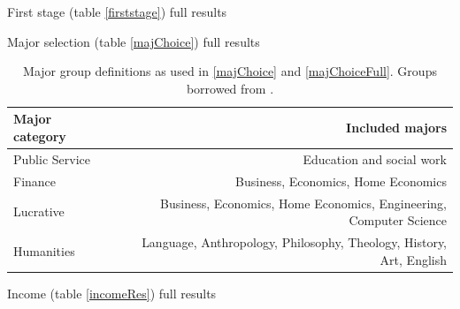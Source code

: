 \documentclass[12pt]{article}
\newcommand{\regs}{../Analysis/Regressions/Output/}
\begin{document}
	\begin{table}
		\centering
		\scriptsize
		\caption{First stage (table \ref{firststage}) full results}
		
		\label{firststagefull}
	\end{table}

	\begin{table}
		\centering
		\scriptsize
		\caption{Major selection (table \ref{majChoice}) full results}
		
		\label{majChoiceFull}
	\end{table}

	\begin{table}
		\centering
		\caption{Major group definitions as used in \ref{majChoice} and \ref{majChoiceFull}. Groups borrowed from \textcite{rothstein2011}.}
		\begin{tabular}{lr}
			\toprule
			Major category & Included majors \\
			\midrule 
			Public Service & Education and social work \\
			Finance & Business, Economics, Home Economics \\
			Lucrative & Business, Economics, Home Economics, Engineering, Computer Science \\
			Humanities & Language, Anthropology, Philosophy, Theology, History, Art, English \\ \bottomrule
		\end{tabular}
		\label{majGroups}
	\end{table}

	\begin{table}
		\centering
		\scriptsize
		\caption{Income (table \ref{incomeRes}) full results}
		
	\end{table}

	\clearpage
	
	\printbibliography
	
\end{document}

